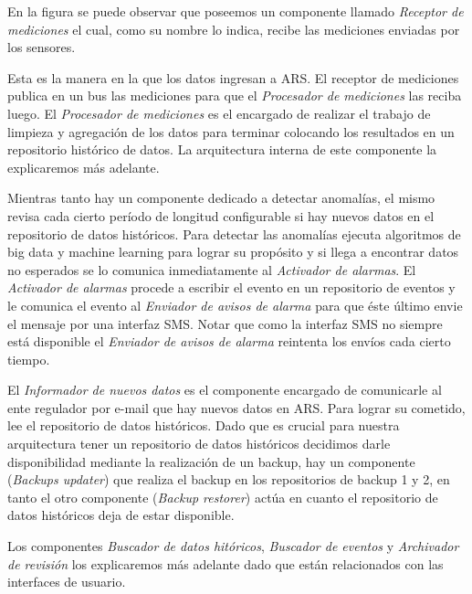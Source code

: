 \par En la figura se puede observar que poseemos un componente llamado \textit{Receptor de mediciones} el cual, como su nombre lo indica, recibe las mediciones enviadas por los sensores.
\par Esta es la manera en la que los datos ingresan a ARS. El receptor de mediciones publica en un bus las mediciones para que el \textit{Procesador de mediciones} las reciba luego. El \textit{Procesador de mediciones} es el encargado de realizar el trabajo de limpieza y agregación de los datos para terminar colocando los resultados en un repositorio histórico de datos. La arquitectura interna de este componente la explicaremos más adelante.
\par Mientras tanto hay un componente dedicado a detectar anomalías, el mismo revisa cada cierto período de longitud configurable si hay nuevos datos en el repositorio de datos históricos. Para detectar las anomalías ejecuta algoritmos de big data y machine learning para lograr su propósito y si llega a encontrar datos no esperados se lo comunica inmediatamente al \textit{Activador de alarmas}. El \textit{Activador de alarmas} procede a escribir el evento en un repositorio de eventos y le comunica el evento al \textit{Enviador de avisos de alarma} para que éste último envie el mensaje por una interfaz SMS. Notar que como la interfaz SMS no siempre está disponible el \textit{Enviador de avisos de alarma} reintenta los envíos cada cierto tiempo.
\par El \textit{Informador de nuevos datos} es el componente encargado de comunicarle al ente regulador por e-mail que hay nuevos datos en ARS. Para lograr su cometido, lee el repositorio de datos históricos. Dado que es crucial para nuestra arquitectura tener un repositorio de datos históricos decidimos darle disponibilidad mediante la realización de un backup, hay un componente (\textit{Backups updater}) que realiza el backup en los repositorios de backup 1 y 2, en tanto el otro componente (\textit{Backup restorer}) actúa en cuanto el repositorio de datos históricos deja de estar disponible.
\par Los componentes \textit{Buscador de datos hitóricos}, \textit{Buscador de eventos} y \textit{Archivador de revisión} los explicaremos más adelante dado que están relacionados con las interfaces de usuario.


